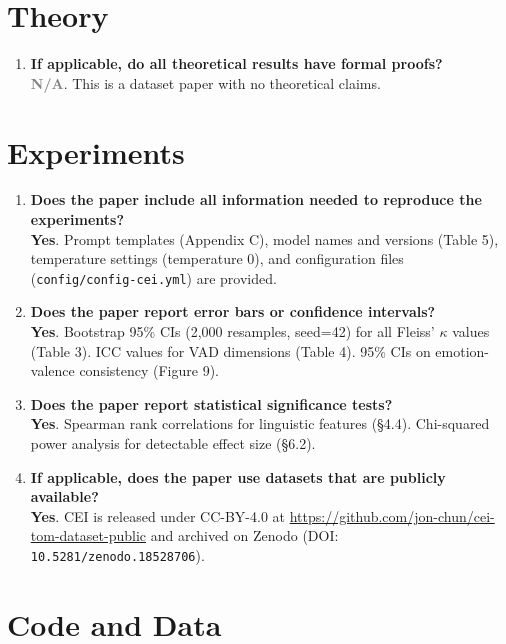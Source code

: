 \documentclass[11pt]{article}
\newcommand{\yes}{\textcolor{green!60!black}{\textbf{Yes}}}
\newcommand{\na}{\textcolor{gray}{\textbf{N/A}}}
\begin{document}
\section{Theory}

\begin{enumerate}[leftmargin=*]
    \item \textbf{If applicable, do all theoretical results have formal proofs?} \\
    \na. This is a dataset paper with no theoretical claims.
\end{enumerate}

\section{Experiments}

\begin{enumerate}[leftmargin=*]
    \item \textbf{Does the paper include all information needed to reproduce the experiments?} \\
    \yes. Prompt templates (Appendix C), model names and versions (Table 5), temperature settings (temperature 0), and configuration files (\texttt{config/config-cei.yml}) are provided.

    \item \textbf{Does the paper report error bars or confidence intervals?} \\
    \yes. Bootstrap 95\% CIs (2,000 resamples, seed=42) for all Fleiss' $\kappa$ values (Table 3). ICC values for VAD dimensions (Table 4). 95\% CIs on emotion-valence consistency (Figure 9).

    \item \textbf{Does the paper report statistical significance tests?} \\
    \yes. Spearman rank correlations for linguistic features (\S4.4). Chi-squared power analysis for detectable effect size (\S6.2).

    \item \textbf{If applicable, does the paper use datasets that are publicly available?} \\
    \yes. CEI is released under CC-BY-4.0 at \url{https://github.com/jon-chun/cei-tom-dataset-public} and archived on Zenodo (DOI: \texttt{10.5281/zenodo.18528706}).
\end{enumerate}

\section{Code and Data}
\end{document}

